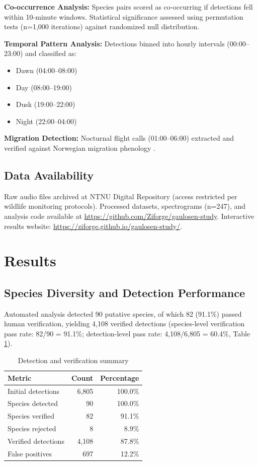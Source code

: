 \documentclass[twocolumn]{article}
\begin{document}
\textbf{Co-occurrence Analysis:} Species pairs scored as co-occurring if detections fell within 10-minute windows. Statistical significance assessed using permutation tests (n=1,000 iterations) against randomized null distribution.

\textbf{Temporal Pattern Analysis:} Detections binned into hourly intervals (00:00--23:00) and classified as:
\begin{itemize}
\item Dawn (04:00--08:00)
\item Day (08:00--19:00)
\item Dusk (19:00--22:00)
\item Night (22:00--04:00)
\end{itemize}

\textbf{Migration Detection:} Nocturnal flight calls (01:00--06:00) extracted and verified against Norwegian migration phenology \citep{Shimmings2016}.

\subsection{Data Availability}

Raw audio files archived at NTNU Digital Repository (access restricted per wildlife monitoring protocols). Processed datasets, spectrograms (n=247), and analysis code available at \url{https://github.com/Ziforge/gaulosen-study}. Interactive results website: \url{https://ziforge.github.io/gaulosen-study/}.

\section{Results}

\subsection{Species Diversity and Detection Performance}

Automated analysis detected 90 putative species, of which 82 (91.1\%) passed human verification, yielding 4,108 verified detections (species-level verification pass rate: 82/90 = 91.1\%; detection-level pass rate: 4,108/6,805 = 60.4\%, Table \ref{tab:verification}).

\begin{table}[H]
\centering
\caption{Detection and verification summary}
\label{tab:verification}
\begin{tabular}{lrr}
\toprule
\textbf{Metric} & \textbf{Count} & \textbf{Percentage} \\
\midrule
Initial detections & 6,805 & 100.0\% \\
Species detected & 90 & 100.0\% \\
Species verified & 82 & 91.1\% \\
Species rejected & 8 & 8.9\% \\
Verified detections & 4,108 & 87.8\% \\
False positives & 697 & 12.2\% \\
\bottomrule
\end{tabular}
\end{table}
\end{document}
